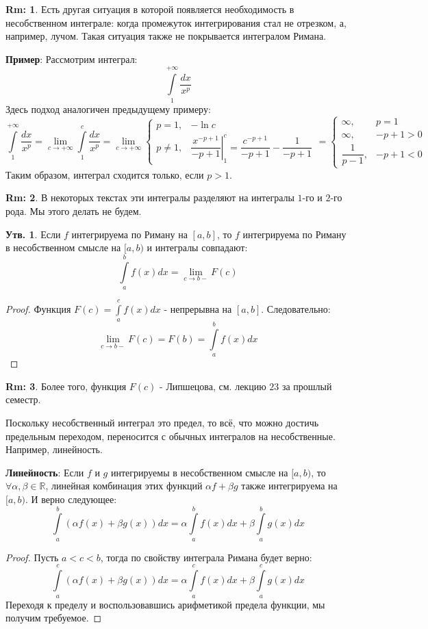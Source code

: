 \documentclass[12pt]{article}
\newcommand{\MR}{\mathbb{R}}
\theoremstyle{definition}
\newtheorem{rem}{Rm:}
\newtheorem{prop}{Утв.}
\newcommand{\ddint}[2]{\displaystyle\int\limits_{#1}^{#2}}
\begin{document}
\begin{rem}
	Есть другая ситуация в которой появляется необходимость в несобственном интеграле: когда промежуток интегрирования стал не отрезком, а, например, лучом. Такая ситуация также не покрывается интегралом Римана.
\end{rem}
\textbf{Пример}: Рассмотрим интеграл:
$$
	\ddint{1}{+\infty}\dfrac{dx}{x^p}
$$
Здесь подход аналогичен предыдущему примеру:
$$
	\ddint{1}{+\infty}\dfrac{dx}{x^p} = \lim\limits_{c \to +\infty} \ddint{1}{c}\dfrac{dx}{x^p} = \lim\limits_{c \to +\infty}
	\begin{cases}
		p = 1, & -\ln{c} \\
		p \neq 1, & \left. \dfrac{x^{-p + 1}}{-p + 1}\right|_1^c =  \dfrac{c^{-p+1}}{-p + 1} - \dfrac{1}{-p +1}
	\end{cases}
	=
	\begin{cases}
		\infty, &p = 1 \\
		\infty, & -p + 1 > 0 \\
		\dfrac{1}{p - 1} , & -p + 1 < 0
	\end{cases}
$$	
Таким образом, интеграл сходится только, если $p > 1$.
\begin{rem}
	В некоторых текстах эти интегралы разделяют на интегралы $1$-го и $2$-го рода. Мы этого делать не будем.
\end{rem}

\begin{prop}
	Если $f$ интегрируема по Риману на $[a,b]$, то $f$ интегрируема по Риману в несобственном смысле на $[a,b)$ и интегралы совпадают:
	$$
		\ddint{a}{b}f(x)dx = \lim\limits_{c \to b-}F(c)
	$$
\end{prop}
\begin{proof}
	Функция $F(c) = \ddint{a}{c}f(x)dx$ - непрерывна на $[a,b]$. Следовательно:
	$$
		\lim\limits_{c \to b-}F(c) = F(b) = \ddint{a}{b}f(x)dx
	$$
\end{proof}
\begin{rem}
	Более того, функция $F(c)$ - Липшецова, см. лекцию $23$ за прошлый семестр.
\end{rem}
Поскольку несобственный интеграл это предел, то всё, что можно достичь предельным переходом, переносится с обычных интегралов на несобственные. Например, линейность.

\textbf{Линейность}: Если $f$ и $g$ интегрируемы в несобственном смысле на $[a,b)$, то $\forall \alpha, \beta \in \MR$, линейная комбинация этих функций $\alpha f + \beta g$ также интегрируема на $[a,b)$. И верно следующее:
$$
	\ddint{a}{b}\left(\alpha f(x) + \beta g(x)\right)dx = \alpha \ddint{a}{b}f(x)dx + \beta\ddint{a}{b}g(x) dx
$$
\begin{proof}
	Пусть $a < c < b$, тогда по свойству интеграла Римана будет верно:
	$$
		\ddint{a}{c}\left(\alpha f(x) + \beta g(x)\right)dx = \alpha \ddint{a}{c}f(x)dx + \beta\ddint{a}{c}g(x) dx
	$$
	Переходя к пределу и воспользовавшись арифметикой предела функции, мы получим требуемое.
\end{proof}
\end{document}
